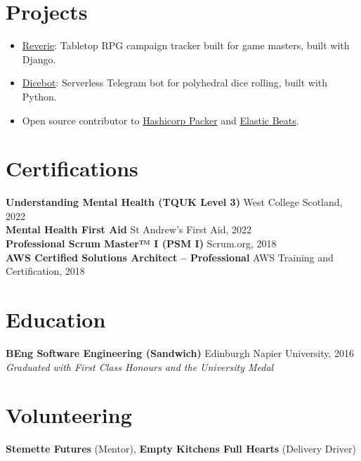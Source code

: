 \documentclass[11pt]{article}       %
\begin{document}
\section*{Projects}
\begin{itemize}
  \item \href{https://github.com/oneirism/reverie}{Reverie}: Tabletop RPG campaign tracker built for game masters, built with Django.
  \item \href{https://github.com/oneirism/dicebot}{Dicebot}: Serverless Telegram bot for polyhedral dice rolling, built with Python.
  \item Open source contributor to \href{https://github.com/hashicorp/packer}{Hashicorp Packer} and \href{https://github.com/elastic/beats}{Elastic Beats}.
\end{itemize}

\vspace{-18.5pt}

\section*{Certifications}
\textbf{Understanding Mental Health (TQUK Level 3)} \hfill West College Scotland, 2022 \\
\textbf{Mental Health First Aid} \hfill St Andrew's First Aid, 2022 \\
\textbf{Professional Scrum Master™ I (PSM I)} \hfill Scrum.org, 2018 \\
\textbf{AWS Certified Solutions Architect – Professional} \hfill AWS Training and Certification, 2018 \\

\vspace{-6.5pt}

\section*{Education}
\textbf{BEng Software Engineering (Sandwich)} \hfill Edinburgh Napier University, 2016 \\
\textit{Graduated with First Class Honours and the University Medal} \\

\vspace{-6.5pt}

\section*{Volunteering}
\textbf{Stemette Futures} (Mentor), \textbf{Empty Kitchens Full Hearts} (Delivery Driver) \\
\end{document}
